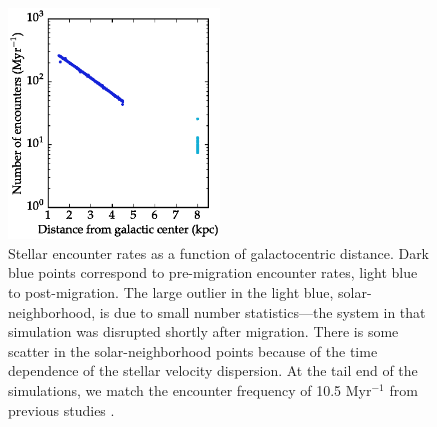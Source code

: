 \documentclass[preprint,12pt]{aastex}
\begin{document}
\begin{figure}
\includegraphics[width=0.5\textwidth]{encvsR.eps}
\caption{Stellar encounter rates as a function of galactocentric distance.
  Dark blue points correspond to pre-migration encounter rates, light 
  blue to post-migration. The large outlier in the light blue, 
  solar-neighborhood, is due to small number statistics---the system 
  in that simulation was disrupted shortly after migration. There is some 
  scatter in the solar-neighborhood points because of the time dependence 
  of the stellar velocity dispersion. At the tail end of the simulations, we 
  match the encounter frequency of 10.5 Myr$^{-1}$ from previous 
  studies \citep{Garciasanchez2001,Rickman2008}.}
\label{fig:encrates}
\end{figure}

\end{document}
